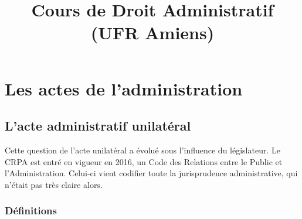 \documentclass[10pt, a4paper, openany]{book}
\date{}
\title{Cours de Droit Administratif (UFR Amiens)}
\begin{document}
\maketitle
\tableofcontents


\part{Les actes de l'administration}

\chapter{L'acte administratif unilatéral}

Cette question de l'acte unilatéral a évolué sous l'influence du législateur. Le CRPA est entré en vigueur en 2016, un Code des Relations entre le Public et l'Administration. Celui-ci vient codifier toute la jurisprudence administrative, qui n'était pas très claire alors.

\section{Définitions}
\end{document}
